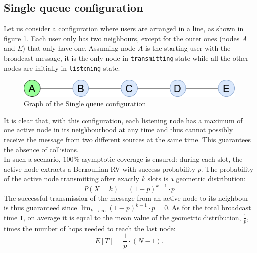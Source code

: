 \subsection{Single queue configuration}\label{ssec:singlequeue}
Let us consider a configuration where users are arranged in a line, as shown in
figure \ref{fig:single_queue_graph}. Each user only has two neighbours, except for
the outer ones (nodes $A$ and $E$) that only have one. Assuming node $A$ is the
starting user with the broadcast message, it is the only node in
\texttt{transmitting} state while all the other nodes are initially in
\texttt{listening} state. 
\begin{figure}[H]
    \begin{center}
        \includegraphics[scale=0.6]{img/single_queue.png}
        \caption{Graph of the Single queue configuration}
        \label{fig:single_queue_graph}
    \end{center}
    \vspace*{-0.4cm}
\end{figure}
\noindent It is clear that, with this configuration, each listening node has a
maximum of one active node in its neighbourhood at any time and thus cannot possibly receive
the message from two different sources at the same time. This guarantees the
absence of collisions.\\
In such a scenario, $100\%$ asymptotic coverage is
ensured: during each slot, the active node extracts a Bernoullian RV with
success probability $p$. The probability of the active node transmitting after exactly
$k$ slots is a geometric distribution:
\begin{equation}
	P(X = k) = (1 - p)^{k-1} \cdot p
	\label{geometricDistribution}
\end{equation}
The successful transmission of the message from an active node to its neighbour
is thus guaranteed since $\lim_{k \to \infty} (1 - p)^{k-1} \cdot p = 0$.
As for the total broadcast time \texttt{T}, on average it is equal to the mean
value of the geometric distribution, $\frac{1}{p}$, times the number of hops
needed to reach the last node:
\begin{equation}
	E[T] = \frac{1}{p} \cdot (N - 1).
	\label{eq:singleQueueMeanT}
\end{equation}

